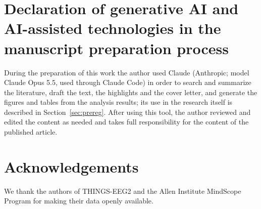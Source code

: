 \documentclass[11pt]{article}
\begin{document}
\section*{Declaration of generative AI and AI-assisted technologies in the manuscript preparation process}
During the preparation of this work the author used Claude (Anthropic; model Claude Opus 5.5, used through Claude Code) in order to search and summarize the literature, draft the text, the highlights and the cover letter, and generate the figures and tables from the analysis results; its use in the research itself is described in Section~\ref{sec:prereg}.
After using this tool, the author reviewed and edited the content as needed and takes full responsibility for the content of the published article.

\section*{Acknowledgements}
We thank the authors of THINGS-EEG2 and the Allen Institute MindScope Program for making their data openly available.



\end{document}
